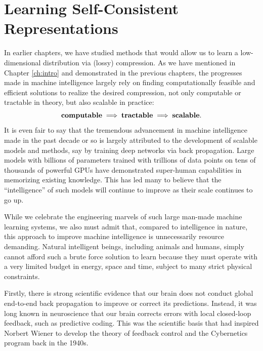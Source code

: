 \documentclass[../../book-main.tex]{subfiles}
\begin{document}

\section{Learning Self-Consistent Representations}
\label{sec:self-consistency}

In earlier chapters, we have studied methods that would allow us to learn a low-dimensional distribution via (lossy) compression. As we have mentioned in Chapter \ref{ch:intro} and demonstrated in the previous chapters, the progresses made in machine intelligence largely rely on finding computationally feasible and efficient solutions to realize the desired compression, not only computable or tractable in theory, but also scalable in practice:
\begin{equation}
\mbox{\textbf{computable}} \;
   \Longrightarrow \; \mbox{\textbf{tractable}} \; \Longrightarrow \; 
   \mbox{\textbf{scalable}}.
\end{equation}
It is even fair to say that the tremendous advancement in machine intelligence made in the past decade or so is largely attributed to the development of scalable models and methods, say by training deep networks via back propagation. Large models with billions of parameters trained with trillions of data points on tens of thousands of powerful GPUs have demonstrated super-human capabilities in memorizing existing knowledge. This has led many to believe that the ``intelligence'' of such models will continue to improve as their scale continues to go up. 

While we celebrate the engineering marvels of such large man-made machine learning  systems, we also must admit that, compared to intelligence in nature, this approach to improve machine intelligence is unnecessarily resource demanding. Natural intelligent beings, including animals and humans, simply cannot afford such a brute force solution to learn because they must operate with a very limited budget in energy, space and time, subject to many strict physical constraints. 

Firstly, there is strong scientific evidence that our brain does not conduct global end-to-end back propagation to improve or correct its predictions. Instead, it was long known in neuroscience that our brain corrects errors with local closed-loop feedback, such as predictive coding. This was the scientific basis that had inspired Norbert Wiener to develop the theory of feedback control and the Cybernetics program back in the 1940s. 
\end{document}
